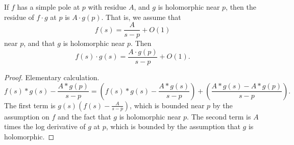 \begin{theorem}[ResidueMult]
\label{ResidueMult}
\leanok
If $f$ has a simple pole at $p$ with residue $A$, and $g$ is holomorphic near $p$, then the
  residue of $f \cdot g$ at $p$ is $A \cdot g(p)$. That is, we assume that
  $$
  f(s) = \frac{A}{s - p} + O(1)$$
  near $p$, and that $g$ is holomorphic near $p$. Then
  $$
  f(s) \cdot g(s) = \frac{A \cdot g(p)}{s - p} + O(1).$$
\end{theorem}
\begin{proof}
\leanok
Elementary calculation.
  $$
  f(s) * g(s) - \frac{A * g(p)}{s - p} =
  \left(f(s) * g(s) - \frac{A * g(s)}{s - p}\right)
  + \left(\frac{A * g(s) - A * g(p)}{s - p}\right).
  $$
  The first term is $g(s)(f(s) - \frac{A}{s - p})$, which is bounded near $p$ by the assumption
  on $f$
   and the fact that $g$ is holomorphic near $p$.
  The second term is $A$ times the log derivative of $g$ at $p$, which is bounded by the assumption
  that  $g$ is holomorphic.
\end{proof}
